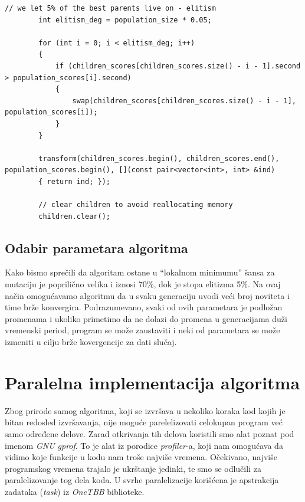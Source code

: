 \documentclass[12pt, a4paper]{article}
\begin{document}
	\begin{lstlisting}[caption={Proces selekcije i elitizam (prelazak u sledeću generaciju)}]
		// we let 5% of the best parents live on - elitism
		int elitism_deg = population_size * 0.05;
		
		for (int i = 0; i < elitism_deg; i++)
		{
			if (children_scores[children_scores.size() - i - 1].second > population_scores[i].second)
			{
				swap(children_scores[children_scores.size() - i - 1], population_scores[i]);
			}
		}
		
		transform(children_scores.begin(), children_scores.end(), population_scores.begin(), [](const pair<vector<int>, int> &ind)
		{ return ind; });
		
		// clear children to avoid reallocating memory
		children.clear();
	\end{lstlisting}
	
	\subsection{Odabir parametara algoritma}
	Kako bismo sprečili da algoritam ostane u “lokalnom minimumu” šansa za mutaciju je poprilično velika i iznosi 70\%, dok je stopa elitizma 5\%. Na ovaj način omogućavamo algoritmu da u svaku generaciju uvodi veći broj noviteta i time brže konvergira. Podrazumevano, svaki od ovih parametara je podložan promenama i ukoliko primetimo da ne dolazi do promena u generacijama duži vremenski period, program se može zaustaviti i neki od parametara se može izmeniti u cilju brže kovergencije za dati slučaj.
	
	\newpage
	
	\section{Paralelna implementacija algoritma}
	
	Zbog prirode samog algoritma, koji se izvršava u nekoliko koraka kod kojih je bitan redosled izvršavanja, nije moguće parelelizovati celokupan program već samo određene delove. Zarad otkrivanja tih delova koristili smo alat poznat pod imenom \textit{GNU gprof}. To je alat iz porodice \textit{profiler}-a, koji nam omogućava da vidimo koje funkcije u kodu nam troše najviše vremena. Očekivano, najviše programskog vremena trajalo je ukrštanje jedinki, te smo se odlučili za paralelizovanje tog dela koda. U svrhe paralelizacije korišćena je apstrakcija zadataka (\textit{task}) iz \textit{OneTBB} biblioteke.
	
\end{document}
